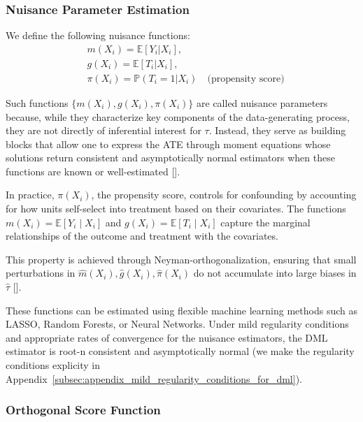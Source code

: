 \documentclass{article}
\numberwithin{equation}{section}
\begin{document}
\subsubsection{Nuisance Parameter Estimation}

We define the following nuisance functions:
\begin{align}
& m(X_i) = \mathbb{E}[Y_i | X_i],
\label{eq:m_x_for_target}
\\
& g(X_i) = \mathbb{E}[T_i | X_i],
\label{eq:g_x_for_treatment}
\\
& \pi(X_i) = \mathbb{P}(T_i = 1 | X_i) \quad \text{(propensity score)}
\label{eq:pi_x_for_treatment}
\end{align}

Such functions \(\{m(X_i), g(X_i), \pi(X_i)\}\) are called nuisance parameters because, while they characterize key components of the data-generating process, they are not directly of inferential interest for \(\tau\). Instead, they serve as building blocks that allow one to express the ATE through moment equations whose solutions return consistent and asymptotically normal estimators when these functions are known or well-estimated [\cite{Chernozhukov2018, Newey1990, RobinsRotnitzkyZhao1994}].

In practice, \(\pi(X_i)\), the propensity score, controls for confounding by accounting for how units self-select into treatment based on their covariates. The functions \(m(X_i) = \mathbb{E}[Y_i \mid X_i]\) and \(g(X_i) = \mathbb{E}[T_i \mid X_i]\) capture the marginal relationships of the outcome and treatment with the covariates.

This property is achieved through Neyman-orthogonalization, ensuring that small perturbations in \(\hat{m}(X_i), \hat{g}(X_i), \hat{\pi}(X_i)\) do not accumulate into large biases in \(\hat{\tau}\) [\cite{Chernozhukov2018, BelloniChernozhukovHansen2014}].

These functions can be estimated using flexible machine learning methods such as LASSO, Random Forests, or Neural Networks. Under mild regularity conditions and appropriate rates of convergence for the nuisance estimators, the DML estimator is root-n consistent and asymptotically normal (we make the regularity conditions explicity in Appendix~\ref{subsec:appendix_mild_regularity_conditions_for_dml}).

\subsubsection{Orthogonal Score Function}
\end{document}
